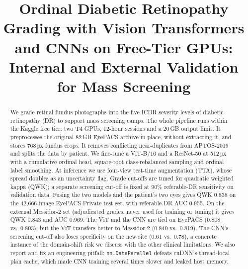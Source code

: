 \documentclass[conference,a4paper]{IEEEtran}
\begin{document}
\title{Ordinal Diabetic Retinopathy Grading with Vision Transformers and CNNs on Free-Tier GPUs: Internal and External Validation for Mass Screening}

\author{
}

\maketitle

\begin{abstract}
We grade retinal fundus photographs into the five ICDR severity levels of diabetic retinopathy (DR) to support mass screening camps.
The whole pipeline runs within the Kaggle free tier: two T4 GPUs, 12-hour sessions and a 20\,GB output limit.
It preprocesses the original 82\,GB EyePACS archive in place, without extracting it, and stores 768\,px fundus crops.
It removes conflicting near-duplicates from APTOS-2019 and splits the data by patient.
We fine-tune a ViT-B/16 and a ResNet-50 at 512\,px with a cumulative ordinal head, square-root class-rebalanced sampling and ordinal label smoothing.
At inference we use four-view test-time augmentation (TTA), whose spread doubles as an uncertainty flag.
Grade cut-offs are tuned for quadratic weighted kappa (QWK); a separate screening cut-off is fixed at 90\% referable-DR sensitivity on validation data.
Fusing the two models and the patient's two eyes gives QWK 0.838 on the 42,666-image EyePACS Private test set, with referable-DR AUC 0.955.
On the external Messidor-2 set (adjudicated grades, never used for training or tuning) it gives QWK 0.843 and AUC 0.969.
The ViT and the CNN are tied on EyePACS (0.808 vs.\ 0.803), but the ViT transfers better to Messidor-2 (0.840 vs.\ 0.819).
The CNN's screening cut-off also loses specificity on the new site (0.61 vs.\ 0.78), a concrete instance of the domain-shift risk we discuss with the other clinical limitations.
We also report and fix an engineering pitfall: \texttt{nn.DataParallel} defeats cuDNN's thread-local plan cache, which made CNN training several times slower and leaked host memory.
\end{abstract}
\end{document}
